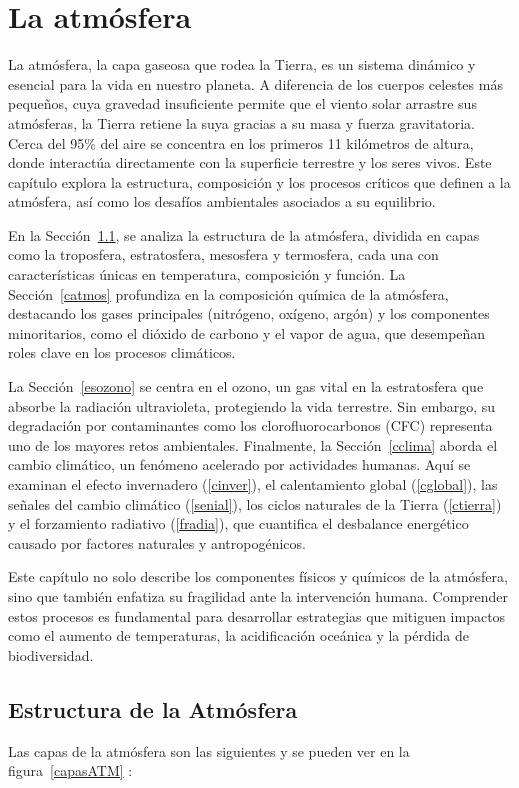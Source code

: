 \chapter{La atm\'osfera}
 
La atmósfera, la capa gaseosa que rodea la Tierra, es un sistema dinámico y esencial para la vida en nuestro planeta. A diferencia de los cuerpos celestes más pequeños, cuya gravedad insuficiente permite que el viento solar arrastre sus atmósferas, la Tierra retiene la suya gracias a su masa y fuerza gravitatoria. Cerca del 95\% del aire se concentra en los primeros 11 kilómetros de altura, donde interactúa directamente con la superficie terrestre y los seres vivos. Este capítulo explora la estructura, composición y los procesos críticos que definen a la atmósfera, así como los desafíos ambientales asociados a su equilibrio.

En la  Sección~\ref{eatmos}, se analiza la estructura de la atmósfera, dividida en capas como la troposfera, estratosfera, mesosfera y termosfera, cada una con características únicas en temperatura, composición y función. La Sección~\ref{catmos} profundiza en la composición química de la atmósfera, destacando los gases principales (nitrógeno, oxígeno, argón) y los componentes minoritarios, como el dióxido de carbono y el vapor de agua, que desempeñan roles clave en los procesos climáticos.

La Sección~\ref{esozono} se centra en el ozono, un gas vital en la estratosfera que absorbe la radiación ultravioleta, protegiendo la vida terrestre. Sin embargo, su degradación por contaminantes como los clorofluorocarbonos (CFC) representa uno de los mayores retos ambientales. Finalmente, la Sección~\ref{cclima} aborda el cambio climático, un fenómeno acelerado por actividades humanas. Aquí se examinan el efecto invernadero (\ref{cinver}), el calentamiento global (\ref{cglobal}), las señales del cambio climático (\ref{senial}), los ciclos naturales de la Tierra (\ref{ctierra}) y el forzamiento radiativo (\ref{fradia}), que cuantifica el desbalance energético causado por factores naturales y antropogénicos.

Este capítulo no solo describe los componentes físicos y químicos de la atmósfera, sino que también enfatiza su fragilidad ante la intervención humana. Comprender estos procesos es fundamental para desarrollar estrategias que mitiguen impactos como el aumento de temperaturas, la acidificación oceánica y la pérdida de biodiversidad.

 \section{Estructura de la Atm\'osfera}
 \label{eatmos}
  Las capas de la atm\'osfera son las siguientes y se pueden ver en la figura~\ref{capasATM} :


